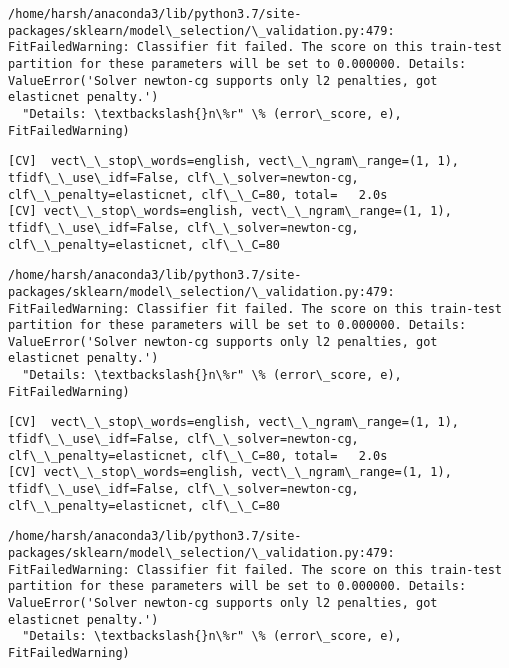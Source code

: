 \documentclass[11pt]{article}
\begin{document}
    \begin{Verbatim}[commandchars=\\\{\}]
/home/harsh/anaconda3/lib/python3.7/site-packages/sklearn/model\_selection/\_validation.py:479: FitFailedWarning: Classifier fit failed. The score on this train-test partition for these parameters will be set to 0.000000. Details: 
ValueError('Solver newton-cg supports only l2 penalties, got elasticnet penalty.')
  "Details: \textbackslash{}n\%r" \% (error\_score, e), FitFailedWarning)

    \end{Verbatim}

    \begin{Verbatim}[commandchars=\\\{\}]
[CV]  vect\_\_stop\_words=english, vect\_\_ngram\_range=(1, 1), tfidf\_\_use\_idf=False, clf\_\_solver=newton-cg, clf\_\_penalty=elasticnet, clf\_\_C=80, total=   2.0s
[CV] vect\_\_stop\_words=english, vect\_\_ngram\_range=(1, 1), tfidf\_\_use\_idf=False, clf\_\_solver=newton-cg, clf\_\_penalty=elasticnet, clf\_\_C=80 

    \end{Verbatim}

    \begin{Verbatim}[commandchars=\\\{\}]
/home/harsh/anaconda3/lib/python3.7/site-packages/sklearn/model\_selection/\_validation.py:479: FitFailedWarning: Classifier fit failed. The score on this train-test partition for these parameters will be set to 0.000000. Details: 
ValueError('Solver newton-cg supports only l2 penalties, got elasticnet penalty.')
  "Details: \textbackslash{}n\%r" \% (error\_score, e), FitFailedWarning)

    \end{Verbatim}

    \begin{Verbatim}[commandchars=\\\{\}]
[CV]  vect\_\_stop\_words=english, vect\_\_ngram\_range=(1, 1), tfidf\_\_use\_idf=False, clf\_\_solver=newton-cg, clf\_\_penalty=elasticnet, clf\_\_C=80, total=   2.0s
[CV] vect\_\_stop\_words=english, vect\_\_ngram\_range=(1, 1), tfidf\_\_use\_idf=False, clf\_\_solver=newton-cg, clf\_\_penalty=elasticnet, clf\_\_C=80 

    \end{Verbatim}

    \begin{Verbatim}[commandchars=\\\{\}]
/home/harsh/anaconda3/lib/python3.7/site-packages/sklearn/model\_selection/\_validation.py:479: FitFailedWarning: Classifier fit failed. The score on this train-test partition for these parameters will be set to 0.000000. Details: 
ValueError('Solver newton-cg supports only l2 penalties, got elasticnet penalty.')
  "Details: \textbackslash{}n\%r" \% (error\_score, e), FitFailedWarning)

    \end{Verbatim}
\end{document}
